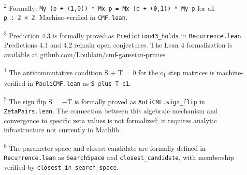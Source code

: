 \documentclass[11pt]{article}
\begin{document}
\textsuperscript{2} Formally:
\texttt{My\ (p\ +\ (1,0))\ *\ Mx\ p\ =\ Mx\ (p\ +\ (0,1))\ *\ My\ p} for
all \texttt{p\ :\ ℤ\ ×\ ℤ}. Machine-verified in \texttt{CMF.lean}.

\textsuperscript{3} Prediction 4.3 is formally proved as
\texttt{Prediction43\_holds} in \texttt{Recurrence.lean}. Predictions
4.1 and 4.2 remain open conjectures. The Lean 4 formalization is
available at github.com/Loublain/cmf-gaussian-primes

\textsuperscript{4} The anticommutative condition S + T = 0 for the
c\textsubscript{1} step matrices is machine-verified in
\texttt{PauliCMF.lean} as \texttt{S\_plus\_T\_c1}.

\textsuperscript{5} The sign flip S = −T is formally proved as
\texttt{AntiCMF.sign\_flip} in \texttt{ZetaPairs.lean}. The connection
between this algebraic mechanism and convergence to specific zeta values
is not formalized; it requires analytic infrastructure not currently in
Mathlib.

\textsuperscript{6} The parameter space and closest candidate are
formally defined in \texttt{Recurrence.lean} as \texttt{SearchSpace} and
\texttt{closest\_candidate}, with membership verified by
\texttt{closest\_in\_search\_space}.
\end{document}
